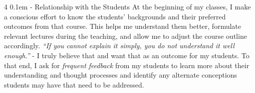 \documentclass[10pt]{article}
\makeatletter
\def \paragraph {%
    \@startsection{paragraph}%
        {4}%
        \z@%
        {0.1em}
        {-\fontdimen 6 \font}%
        {\normalfont \bfseries}%
    }
\makeatother
\begin{document}
\paragraph{Relationship with the Students}
At the beginning of my classes, I make a conscious effort to know the students' backgrounds and their 
preferred outcomes from that course. This helps me understand them better, formulate relevant lectures during the teaching, and allow me to adjust the course outline accordingly. 
\textit{``If you cannot explain it simply, you do not understand it well enough.''} - I truly believe that and want that as an outcome for my students. To that end, I ask for 
\textit{frequent feedback} from my students
to learn more about their understanding and thought processes and identify any alternate conceptions students may have that need to be addressed. 
%
\end{document}
